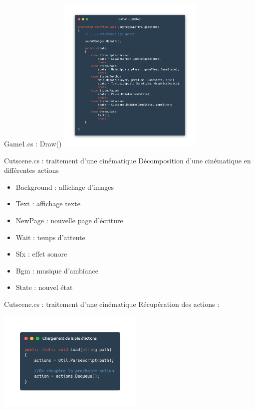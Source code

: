 \documentclass{beamer}
\begin{document}
\begin{frame}{Game1.cs : Draw()}
    \centering
    \includegraphics[width=7cm]{assets/game1update}
\end{frame}

\begin{frame}{Cutscene.cs : traitement d'une cinématique}
    Décomposition d'une cinématique en différentes actions
    
    \begin{itemize}
        \item Background : affichage d'images
        \item Text : affichage texte
        \item NewPage : nouvelle page d'écriture
        \item Wait : temps d'attente
        \item Sfx : effet sonore
        \item Bgm : musique d'ambiance
        \item State : nouvel état
    \end{itemize}
\end{frame}

\begin{frame}{Cutscene.cs : traitement d'une cinématique}
    Récupération des actions : 

    \centering
    \includegraphics[width=7cm]{assets/pile_cutscene}
\end{frame}
\end{document}
